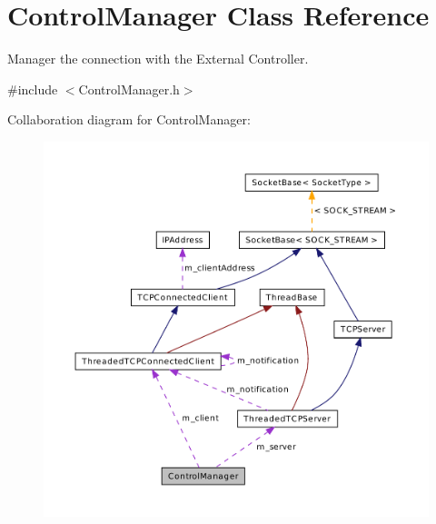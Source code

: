 \hypertarget{class_control_manager}{\section{Control\-Manager Class Reference}
\label{class_control_manager}
}


Manager the connection with the External Controller.  




{\ttfamily \#include $<$Control\-Manager.\-h$>$}



Collaboration diagram for Control\-Manager\-:\nopagebreak
\begin{figure}[H]
\begin{center}
\leavevmode
\includegraphics[width=350pt]{class_control_manager__coll__graph}
\end{center}
\end{figure}
